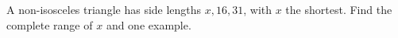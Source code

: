 A non-isosceles triangle has side lengths $ x,16,31 $, with $ x $ the shortest. Find the complete range of $ x $ and one example.

